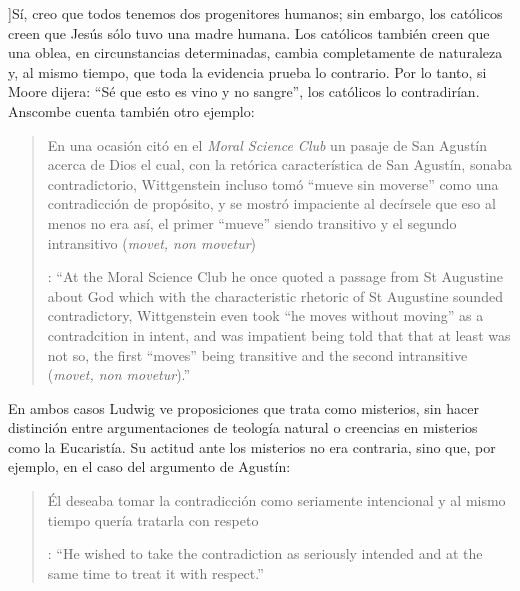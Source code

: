 ]{Sí, creo que todos tenemos dos progenitores humanos; sin embargo, los católicos creen que Jesús sólo tuvo una madre humana. \textelp{} Los católicos también creen que una oblea, en circunstancias determinadas, cambia completamente de naturaleza y, al mismo tiempo, que toda la evidencia prueba lo contrario. Por lo tanto, si Moore dijera: ``Sé que esto es vino y no sangre'', los católicos lo contradirían}. Anscombe cuenta también otro ejemplo:\blockquote[{\cite[122]{anscombe1981parmenides:qli}}: \enquote{At the Moral Science Club he once quoted a passage from St Augustine about God which with the characteristic rhetoric of St Augustine sounded contradictory, Wittgenstein even took ``he moves without moving'' as a contradcition in intent, and was impatient being told that that at least was not so, the first ``moves'' being transitive and the second intransitive (\emph{movet, non movetur}).}]{En una ocasión citó en el \emph{Moral Science Club} un pasaje de San Agustín acerca de Dios el cual, con la retórica característica de San Agustín, sonaba contradictorio, Wittgenstein incluso tomó ``mueve sin moverse'' como una contradicción de propósito, y se mostró impaciente al decírsele que eso al menos no era así, el primer ``mueve'' siendo transitivo y el segundo intransitivo (\emph{movet, non movetur})}. En ambos casos Ludwig ve proposiciones que trata como misterios, sin hacer distinción entre argumentaciones de teología natural o creencias en misterios como la Eucaristía. Su actitud ante los misterios no era contraria, sino que, por ejemplo, en el caso del argumento de Agustín: \blockquote[{\cite[122]{anscombe1981parmenides:qli}}: \enquote{He wished to take the contradiction as seriously intended and at the same time to treat it with respect.}]{Él deseaba tomar la contradicción como seriamente intencional y al mismo tiempo quería tratarla con respeto}.

